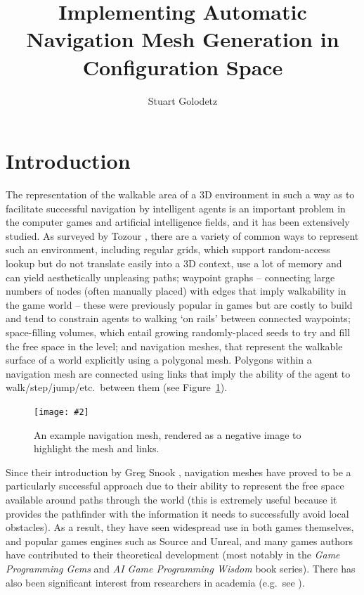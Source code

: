 \documentclass[10pt,twocolumn]{article}
\newcommand{\stufigex}[5]					%
{
	\begin{figure}[#5]
	\begin{center}
		\texttt{[image: \#2]}
		\caption{#3}
		\label{#4}
	\end{center}
	\end{figure}
}
\begin{document}
\title{Implementing Automatic Navigation Mesh Generation in Configuration Space}
\author{Stuart Golodetz}
\date{}
\maketitle

\section{Introduction}

The representation of the walkable area of a 3D environment in such a way as to facilitate successful navigation by intelligent agents is an important problem in the computer games and artificial intelligence fields, and it has been extensively studied. As surveyed by Tozour \cite{tozour04}, there are a variety of common ways to represent such an environment, including regular grids, which support random-access lookup but do not translate easily into a 3D context, use a lot of memory and can yield aesthetically unpleasing paths; waypoint graphs -- connecting large numbers of nodes (often manually placed) with edges that imply walkability in the game world -- these were previously popular in games but are costly to build and tend to constrain agents to walking `on rails' between connected waypoints; space-filling volumes, which entail growing randomly-placed seeds to try and fill the free space in the level; and navigation meshes, that represent the walkable surface of a world explicitly using a polygonal mesh. Polygons within a navigation mesh are connected using links that imply the ability of the agent to walk/step/jump/etc.\ between them (see Figure~\ref{fig:1}).

\stufigex{width=.9\linewidth}{blakeney-midramp-neg.png}{An example navigation mesh, rendered as a negative image to highlight the mesh and links.}{fig:1}{t}

Since their introduction by Greg Snook \cite{snook00}, navigation meshes have proved to be a particularly successful approach due to their ability to represent the free space available around paths through the world (this is extremely useful because it provides the pathfinder with the information it needs to successfully avoid local obstacles). As a result, they have seen widespread use in both games themselves, and popular games engines such as Source and Unreal, and many games authors have contributed to their theoretical development (most notably in the \emph{Game Programming Gems} and \emph{AI Game Programming Wisdom} book series). There has also been significant interest from researchers in academia (e.g.~see \cite{hale09,kallmann10,pettre05,vantoll11}).
\end{document}
